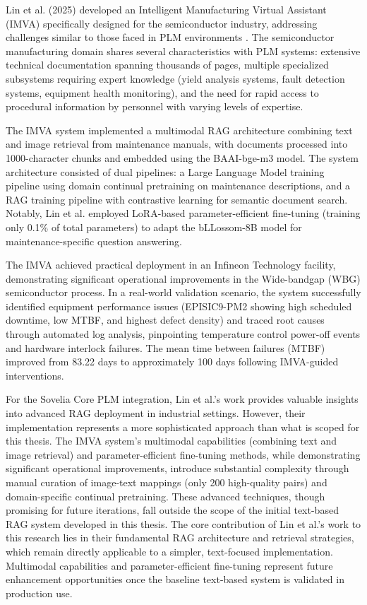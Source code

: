 Lin et al. (2025) developed an Intelligent Manufacturing Virtual Assistant (IMVA) specifically designed for the semiconductor industry, addressing challenges similar to those faced in PLM environments \parencite{lin_generative_2025}. The semiconductor manufacturing domain shares several characteristics with PLM systems: extensive technical documentation spanning thousands of pages, multiple specialized subsystems requiring expert knowledge (yield analysis systems, fault detection systems, equipment health monitoring), and the need for rapid access to procedural information by personnel with varying levels of expertise.

The IMVA system implemented a multimodal RAG architecture combining text and image retrieval from maintenance manuals, with documents processed into 1000-character chunks and embedded using the BAAI-bge-m3 model. The system architecture consisted of dual pipelines: a Large Language Model training pipeline using domain continual pretraining on maintenance descriptions, and a RAG training pipeline with contrastive learning for semantic document search. Notably, Lin et al. employed LoRA-based parameter-efficient fine-tuning (training only 0.1\% of total parameters) to adapt the bLLossom-8B model for maintenance-specific question answering.

The IMVA achieved practical deployment in an Infineon Technology facility, demonstrating significant operational improvements in the Wide-bandgap (WBG) semiconductor process. In a real-world validation scenario, the system successfully identified equipment performance issues (EPISIC9-PM2 showing high scheduled downtime, low MTBF, and highest defect density) and traced root causes through automated log analysis, pinpointing temperature control power-off events and hardware interlock failures. The mean time between failures (MTBF) improved from 83.22 days to approximately 100 days following IMVA-guided interventions.

For the Sovelia Core PLM integration, Lin et al.'s work provides valuable insights into advanced RAG deployment in industrial settings. However, their implementation represents a more sophisticated approach than what is scoped for this thesis. The IMVA system's multimodal capabilities (combining text and image retrieval) and parameter-efficient fine-tuning methods, while demonstrating significant operational improvements, introduce substantial complexity through manual curation of image-text mappings (only 200 high-quality pairs) and domain-specific continual pretraining. These advanced techniques, though promising for future iterations, fall outside the scope of the initial text-based RAG system developed in this thesis. The core contribution of Lin et al.'s work to this research lies in their fundamental RAG architecture and retrieval strategies, which remain directly applicable to a simpler, text-focused implementation. Multimodal capabilities and parameter-efficient fine-tuning represent future enhancement opportunities once the baseline text-based system is validated in production use.

